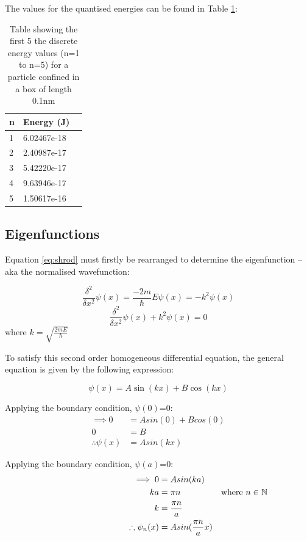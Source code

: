 The values for the quantised energies can be found in Table \ref{tab:qEnerergy}:

\begin{table}[h!]
\centering
\begin{tabular}{|l|l|l|}
\hline
\textbf{n} & \textbf{Energy (J)} \\ \hline
1 & 6.02467e-18 \\ \hline
2 & 2.40987e-17 \\ \hline
3 & 5.42220e-17 \\ \hline
4 & 9.63946e-17 \\ \hline
5 & 1.50617e-16 \\ \hline
\end{tabular}
\captionsetup{font = it, labelfont = bf, width=.91\linewidth, justification=centering}
\caption{Table showing the first 5 the discrete energy values (n=1 to n=5) for a particle confined in a box of length 0.1nm}
\label{tab:qEnerergy}
\end{table}

\subsection{Eigenfunctions}\label{sec:eigenFunction}
Equation \ref{eq:shrod} must firstly be rearranged to determine the eigenfunction -- aka the normalised wavefunction:

$$\frac{\delta^{2}}{\delta x^{2}}\psi (x) = \frac{-2m}{\hbar} E \psi (x) = -k^2 \psi (x)$$
$$\frac{\delta^{2}}{\delta x^{2}}\psi (x) + k^2 \psi (x) = 0$$
where $k=\sqrt{\frac{2mE}{\hbar}}$

To satisfy this second order homogeneous differential equation, the general equation is given by the following expression:

$$\psi (x) = A \sin(kx) + B \cos(kx)$$

Applying the boundary condition, $\psi (0)$=0:
\begin{align*}
\implies 0 &= A sin(0) + B cos(0)\\
 0 &= B\\
\therefore \psi (x) &= A sin(kx)
\end{align*}

Applying the boundary condition, $\psi (a)$=0:
\begin{align*}
\hspace{3.5cm} \implies 0 &= A sin(ka)\\
ka &= \pi n & \text{where } n \in \mathbb{N}\\
k &= \frac{\pi n}{a}\\
\therefore \psi_n (x) &= A sin(\frac{\pi n}{a}x)
\end{align*}

